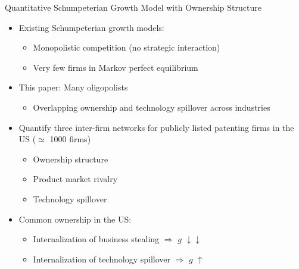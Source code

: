 \documentclass[
  10pt,
  aspectratio=169,   %
]{beamer}
\theoremstyle{plain}
\begin{document}
\begin{frame}{Quantitative Schumpeterian Growth Model with Ownership Structure}
  \begin{itemize}
    \item Existing Schumpeterian growth models:
    \begin{itemize}
      \item Monopolistic competition (no strategic interaction)
      \item Very few firms in Markov perfect equilibrium
    \end{itemize}
    \medskip{}
    \item This paper: Many oligopolists
    \begin{itemize}
      \item Overlapping ownership and technology spillover across industries
    \end{itemize}
    \medskip{}\pause
    \item Quantify three inter-firm networks for publicly listed patenting firms in the US ($\simeq$ 1000 firms)
    \begin{itemize}
      \item Ownership structure
      \item Product market rivalry
      \item Technology spillover
    \end{itemize}
    \medskip{}\pause
    \item Common ownership in the US:
    \begin{itemize}
      \item Internalization of business stealing $\Longrightarrow$ $g$ $\downarrow \downarrow$
      \item Internalization of technology spillover $\Longrightarrow$ $g$ $\uparrow$
    \end{itemize}
  \end{itemize}
\end{frame}
\end{document}

